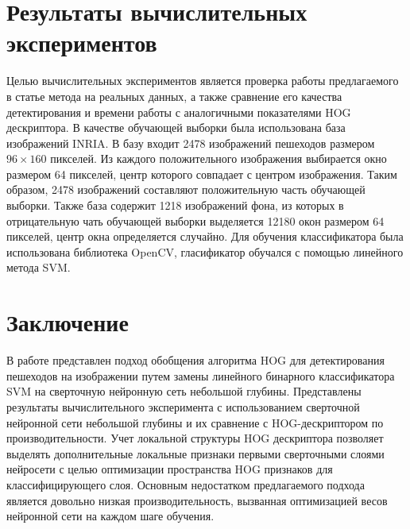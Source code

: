 \documentclass[12pt,twoside]{article}
\begin{document}
\section{Результаты вычислительных экспериментов}
Целью вычислительных экспериментов является проверка работы предлагаемого в статье метода на реальных данных, а также сравнение его качества детектирования и времени работы с аналогичными показателями HOG дескриптора.
В качестве обучающей выборки была использована база изображений INRIA. В базу входит 2478 изображений пешеходов размером $96 \times 160$ пикселей.
Из каждого положительного изображения выбирается окно размером 64 пикселей, центр которого совпадает с центром изображения. Таким образом, 2478 изображений составляют положительную часть обучающей выборки.
Также база содержит 1218 изображений фона, из которых в отрицательную чать обучающей выборки выделяется 12180 окон размером 64 пикселей, центр окна определяется случайно.
Для обучения классификатора была использована библиотека OpenCV, гласификатор обучался с помощью линейного метода SVM.


\section{Заключение}
В работе представлен подход обобщения алгоритма HOG для детектирования пешеходов 
на изображении путем замены линейного бинарного классификатора SVM на сверточную нейронную сеть небольшой глубины.
Представлены результаты вычислительного эксперимента с использованием сверточной нейронной сети небольшой глубины и их сравнение с HOG-дескриптором по производительности. 
Учет локальной структуры HOG дескриптора позволяет выделять дополнительные локальные признаки первыми сверточными слоями нейросети с целью оптимизации пространства HOG признаков для классифицирующего слоя.
Основным недостатком предлагаемого подхода является довольно низкая производительность, вызванная оптимизацией весов нейронной сети на каждом шаге обучения. 


\bigskip
\bigskip
\maketitleSecondary

%
%
\end{document}
